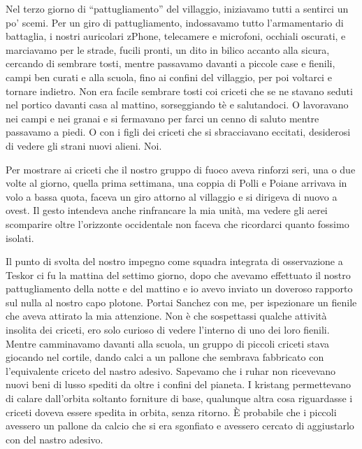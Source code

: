 \hfill\break

Nel terzo giorno di ``pattugliamento'' del villaggio, iniziavamo tutti a
sentirci un po' scemi. Per un giro di pattugliamento, indossavamo tutto
l'armamentario di battaglia, i nostri auricolari zPhone, telecamere e
microfoni, occhiali oscurati, e marciavamo per le strade, fucili pronti,
un dito in bilico accanto alla sicura, cercando di sembrare tosti,
mentre passavamo davanti a piccole case e fienili, campi ben curati e
alla scuola, fino ai confini del villaggio, per poi voltarci e tornare
indietro. Non era facile sembrare tosti coi criceti che se ne stavano
seduti nel portico davanti casa al mattino, sorseggiando tè e
salutandoci. O lavoravano nei campi e nei granai e si fermavano per
farci un cenno di saluto mentre passavamo a piedi. O con i figli dei
criceti che si sbracciavano eccitati, desiderosi di vedere gli strani
nuovi alieni. Noi.

Per mostrare ai criceti che il nostro gruppo di fuoco aveva rinforzi
seri, una o due volte al giorno, quella prima settimana, una coppia di
Polli e Poiane arrivava in volo a bassa quota, faceva un giro attorno al
villaggio e si dirigeva di nuovo a ovest. Il gesto intendeva anche
rinfrancare la mia unità, ma vedere gli aerei scomparire oltre
l'orizzonte occidentale non faceva che ricordarci quanto fossimo
isolati.

Il punto di svolta del nostro impegno come squadra integrata di
osservazione a Teskor ci fu la mattina del settimo giorno, dopo che
avevamo effettuato il nostro pattugliamento della notte e del mattino e
io avevo inviato un doveroso rapporto sul nulla al nostro capo plotone.
Portai Sanchez con me, per ispezionare un fienile che aveva attirato la
mia attenzione. Non è che sospettassi qualche attività insolita dei
criceti, ero solo curioso di vedere l'interno di uno dei loro fienili.
Mentre camminavamo davanti alla scuola, un gruppo di piccoli criceti
stava giocando nel cortile, dando calci a un pallone che sembrava
fabbricato con l'equivalente criceto del nastro adesivo. Sapevamo che i
ruhar non ricevevano nuovi beni di lusso spediti da oltre i confini del
pianeta. I kristang permettevano di calare dall'orbita soltanto
forniture di base, qualunque altra cosa riguardasse i criceti doveva
essere spedita in orbita, senza ritorno. È probabile che i piccoli
avessero un pallone da calcio che si era sgonfiato e avessero cercato di
aggiustarlo con del nastro adesivo.


